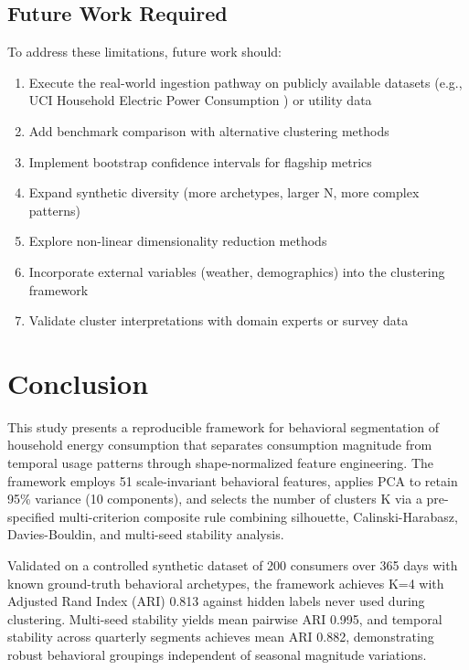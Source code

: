 \documentclass[11pt,a4paper]{article}
\begin{document}
\subsection{Future Work Required}

To address these limitations, future work should:

\begin{enumerate}
    \item Execute the real-world ingestion pathway on publicly available datasets (e.g., UCI Household Electric Power Consumption \cite{uci_household}) or utility data
    \item Add benchmark comparison with alternative clustering methods
    \item Implement bootstrap confidence intervals for flagship metrics
    \item Expand synthetic diversity (more archetypes, larger N, more complex patterns)
    \item Explore non-linear dimensionality reduction methods
    \item Incorporate external variables (weather, demographics) into the clustering framework
    \item Validate cluster interpretations with domain experts or survey data
\end{enumerate}

\section{Conclusion}
\label{sec:conclusion}

This study presents a reproducible framework for behavioral segmentation of household energy consumption that separates consumption magnitude from temporal usage patterns through shape-normalized feature engineering. The framework employs 51 scale-invariant behavioral features, applies PCA to retain 95\% variance (10 components), and selects the number of clusters K via a pre-specified multi-criterion composite rule combining silhouette, Calinski-Harabasz, Davies-Bouldin, and multi-seed stability analysis.

Validated on a controlled synthetic dataset of 200 consumers over 365 days with known ground-truth behavioral archetypes, the framework achieves K=4 with Adjusted Rand Index (ARI) 0.813 against hidden labels never used during clustering. Multi-seed stability yields mean pairwise ARI 0.995, and temporal stability across quarterly segments achieves mean ARI 0.882, demonstrating robust behavioral groupings independent of seasonal magnitude variations.
\end{document}
